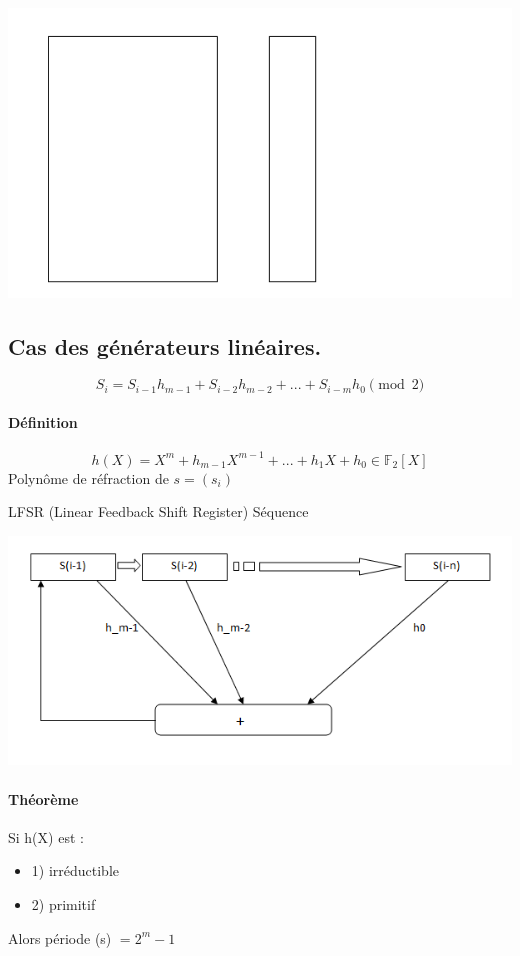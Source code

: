 \documentclass[12pt,a4paper]{article}
\begin{document}
	

	\includegraphics[width=14cm]{schema3.png} 


	\subsection{Cas des générateurs linéaires.}
	
	\begin{displaymath}
	S_i=S_{i-1}h_{m-1} + S_{i-2}h_{m-2} + ... + S_{i-m}h_{0} \pmod{2}
	\end{displaymath}
	
	\paragraph{Définition}
	\begin{displaymath}
	h(X)=X^m + h_{m-1}X^{m-1} + ... + h_1X + h_0 \in \mathbb{F}_2[X]
	\end{displaymath}
	Polynôme de réfraction de $s=(s_i)$
	
	LFSR (Linear Feedback Shift Register) Séquence
	
	\includegraphics[width=16cm]{schema4.png} 
	
	\paragraph{Théorème}
		Si h(X) est :
		\begin{itemize}
		\item 1) irréductible
		\item 2) primitif
		\end{itemize}
		Alors période (s) $ = 2^m - 1$
	
\end{document}
